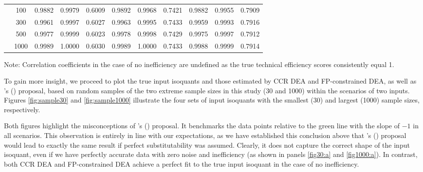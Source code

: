 {\begin{table}[H]
{{\begin{tabular}{ccccccccccc}
                   & 100                                                                    & 0.9882        & 0.9979   & 0.6009     & 0.9892        & 0.9968   & 0.7421     & 0.9882        & 0.9955  & 0.7909       \\
                   & 300                                                                    & 0.9961        & 0.9997   & 0.6027     & 0.9963        & 0.9995   & 0.7433     & 0.9959        & 0.9993 & 0.7916        \\
                   & 500                                                                    & 0.9977        & 0.9999   & 0.6023     & 0.9978        & 0.9998   & 0.7429     & 0.9975        & 0.9997 & 0.7912        \\
                   & 1000                                                                   & 0.9989        & 1.0000   & 0.6030      & 0.9989        & 1.0000   & 0.7433     & 0.9988        & 0.9999  & 0.7914       \\
\bottomrule
\end{tabular}
}}
\vspace{0.5em}
\footnotesize{Note: Correlation coefficients in the case of no inefficiency are undefined as the true technical efficiency scores consistently equal 1.}
\label{tab:mc-cor1}
\end{table}

To gain more insight, we proceed to plot the true input isoquants and those estimated by CCR DEA and FP-constrained DEA, as well as \citeauthor{Barnum2011}'s (\citeyear{Barnum2011}) proposal, based on random samples of the two extreme sample sizes in this study (30 and 1000) within the scenarios of two inputs. Figures \ref{fig:sample30} and \ref{fig:sample1000} illustrate the four sets of input isoquants with the smallest (30) and largest (1000) sample sizes, respectively.

Both figures highlight the misconceptions of \citeauthor{Barnum2011}'s (\citeyear{Barnum2011}) proposal. It benchmarks the data points relative to the green line with the slope of $-1$ in all scenarios. This observation is entirely in line with our expectations, as we have established this conclusion above that \citeauthor{Barnum2011}'s (\citeyear{Barnum2011}) proposal would lead to exactly the same result if perfect substitutability was assumed. Clearly, it does not capture the correct shape of the input isoquant, even if we have perfectly accurate data with zero noise and inefficiency (as shown in panels \ref{fig30:a} and \ref{fig1000:a}). In contrast, both CCR DEA and FP-constrained DEA achieve a perfect fit to the true input isoquant in the case of no inefficiency.

}
